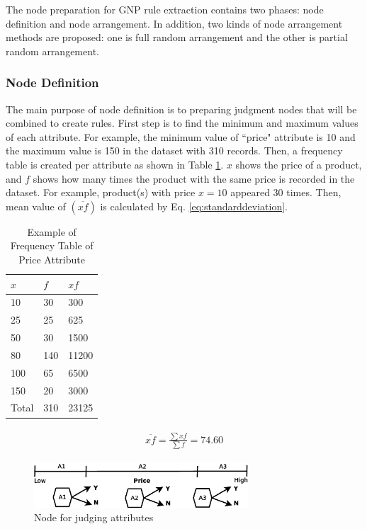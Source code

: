 \documentclass{elsart}
\begin{document}
The node preparation for GNP rule extraction contains two phases: node definition and node arrangement. In addition, two kinds of node arrangement methods are proposed: one is full random arrangement and the other is partial random arrangement.

\subsubsection{Node Definition \label{sec:node-definition}}
The main purpose of node definition is to preparing judgment nodes that will be combined to create rules. First step is to find the minimum and maximum values of each attribute. For example, the minimum value of ``price" attribute is 10 and the maximum value is 150 in the dataset with 310 records. Then, a frequency table is created per attribute as shown in Table \ref{frequency-table}. 
$x$ shows the price of a product, and $f$ shows how many times the product with the same price is recorded in the dataset. For example, product(s) with price $x=10$ appeared 30 times. 
Then, mean value of $(\overline{xf})$ is calculated by Eq. \ref{eq:standarddeviation}.

\begin{table}[tb]
\caption{\label{frequency-table}Example of Frequency Table of Price Attribute}
\begin{flushleft}
\begin{tabular}{|l|l|l|}
\hline 
$x$ & $f$ & $xf$ \tabularnewline
\hline 
10 & 30 & 300 \tabularnewline
\hline 
25 & 25 & 625 \tabularnewline
\hline 
50 & 30 & 1500 \tabularnewline
\hline 
80 & 140 & 11200 \tabularnewline
\hline 
100 & 65 & 6500 \tabularnewline
\hline 
150 & 20 & 3000 \tabularnewline
\hline 
Total & 310 & 23125 \tabularnewline
\hline 
\end{tabular}
\end{flushleft}
\end{table}

\begin{eqnarray}
\begin{array}{lll}
\overline{xf}=\frac{\sum xf}{\sum f}=74.60
\end{array}
\label{eq:standarddeviation}
\end{eqnarray}

\begin{figure}[tb]
\begin{center}
\includegraphics[width=8cm]{images/attributejudge}
\caption{\label{nodejudge} Node for judging attributes}
\end{center}
\end{figure}
\end{document}
